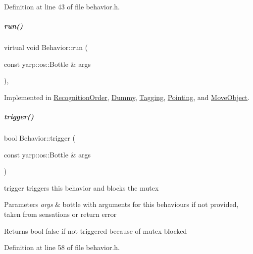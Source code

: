Definition at line 43 of file behavior.\+h.

\mbox{\label{group__behaviorManager_a7dfd81b30f9ddf1864093626650751c3}} 
\subparagraph{\texorpdfstring{run()}{run()}}
{\footnotesize\ttfamily virtual void Behavior\+::run (\begin{DoxyParamCaption}\item[{const yarp\+::os\+::\+Bottle \&}]{args }\end{DoxyParamCaption})\hspace{0.3cm}{\ttfamily [protected]}, {}}



Implemented in \hyperlink{group__behaviorManager_a0a095aa1af770bac92f30042cee21e3a}{Recognition\+Order}, \hyperlink{group__behaviorManager_a49b398f1050441b1a2f63da63420a6f1}{Dummy}, \hyperlink{group__behaviorManager_a8427d7f479b580bbf54030015b506374}{Tagging}, \hyperlink{group__behaviorManager_a6f1a7b52f3c846009e6b510dbb728011}{Pointing}, and \hyperlink{group__behaviorManager_a2e242410f34618b2ff73f9106732470b}{Move\+Object}.

\mbox{\label{group__behaviorManager_ab335b84ae07048c012ed4baaeea4a5fd}} 
\subparagraph{\texorpdfstring{trigger()}{trigger()}}
{\footnotesize\ttfamily bool Behavior\+::trigger (\begin{DoxyParamCaption}\item[{const yarp\+::os\+::\+Bottle \&}]{args }\end{DoxyParamCaption})\hspace{0.3cm}{\ttfamily [inline]}}



trigger triggers this behavior and blocks the mutex 


\begin{DoxyParams}{Parameters}
{\em args} & bottle with arguments for this behaviours if not provided, taken from sensations or return error \\
\hline
\end{DoxyParams}
\begin{DoxyReturn}{Returns}
bool false if not triggered because of mutex blocked 
\end{DoxyReturn}


Definition at line 58 of file behavior.\+h.



